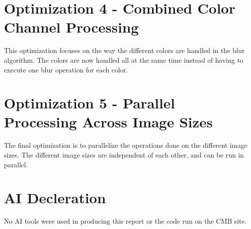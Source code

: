 \documentclass[a4paper,11pt]{article}
\begin{document}
\section*{Optimization 4 - Combined Color Channel Processing}
This optimization focuses on the way the different colors are handled in the blur algorithm. The colors are now handled all at the same time instead of having to execute one blur operation for each color. 

\section*{Optimization 5 - Parallel Processing Across Image Sizes}
The final optimization is to parallelize the operations done on the different image sizes. The different image sizes are independent of each other, and can be run in parallel. 


\section*{AI Decleration}
No AI tools were used in producing this report or the code run on the CMB site.
\end{document}

